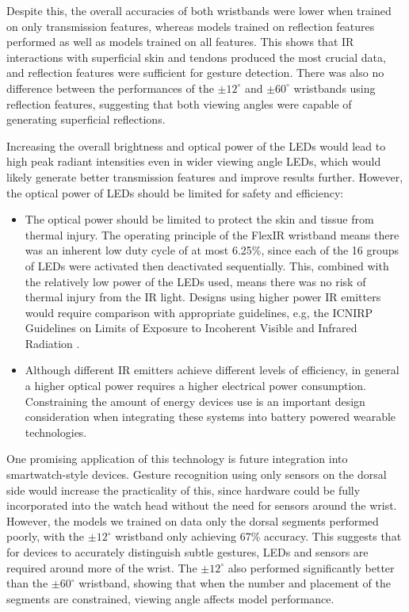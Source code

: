 \documentclass[ oneside,%
                    author={Jack Jarvis},
                    degree={BSc},
                     title={FlexIR: Flexible PCB Wristbands for Infrared Based Gesture Recognition},
                    unit={COMS30045},
                    subtitle={Investigating the Effect of LED Viewing Angle on Gesture Classification in Infrared Sensing Systems}]{dissertation}
\begin{document}
Despite this, the overall accuracies of both wristbands were lower when trained on only transmission features, whereas models trained on reflection features performed as well as models trained on all features. This shows that IR interactions with superficial skin and tendons produced the most crucial data, and reflection features were sufficient for gesture detection. There was also no difference between the performances of the $\pm 12^\circ$ and $\pm 60^\circ$ wristbands using reflection features, suggesting that both viewing angles were capable of generating superficial reflections. 

Increasing the overall brightness and optical power of the LEDs would lead to high peak radiant intensities even in wider viewing angle LEDs, which would likely generate better transmission features and improve results further. However, the optical power of LEDs should be limited for safety and efficiency:

\begin{itemize}
    \item The optical power should be limited to protect the skin and tissue from thermal injury. The operating principle of the FlexIR wristband means there was an inherent low duty cycle of at most 6.25\%, since each of the 16 groups of LEDs were activated then deactivated sequentially. This, combined with the relatively low power of the LEDs used, means there was no risk of thermal injury from the IR light. Designs using higher power IR emitters would require comparison with appropriate guidelines, e.g, the ICNIRP Guidelines on Limits of Exposure to Incoherent Visible and Infrared Radiation \cite{Ziegelberger2013ICNIRPRadiation}.
    \item Although different IR emitters achieve different levels of efficiency, in general a higher optical power requires a higher electrical power consumption. Constraining the amount of energy devices use is an important design consideration when integrating these systems into battery powered wearable technologies.
\end{itemize}

One promising application of this technology is future integration into smartwatch-style devices. Gesture recognition using only sensors on the dorsal side would increase the practicality of this, since hardware could be fully incorporated into the watch head without the need for sensors around the wrist. However, the models we trained on data only the dorsal segments performed poorly, with the $\pm 12^\circ$ wristband only achieving 67\% accuracy. This suggests that for devices to accurately distinguish subtle gestures, LEDs and sensors are required around more of the wrist. The $\pm 12^\circ$ also performed significantly better than the $\pm 60^\circ$ wristband, showing that when the number and placement of the segments are constrained, viewing angle affects model performance.
\end{document}

